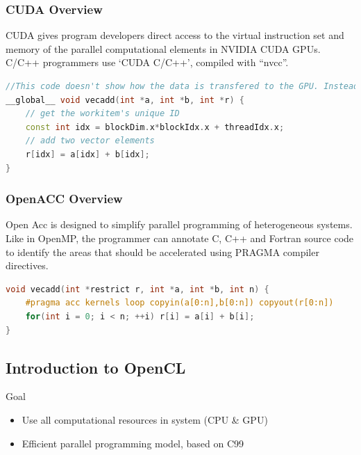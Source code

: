 \hypertarget{cuda-overview}{%
\subsubsection{CUDA Overview}\label{cuda-overview}}

CUDA gives program developers direct access to the virtual instruction
set and memory of the parallel computational elements in NVIDIA CUDA
GPUs. C/C++ programmers use `CUDA C/C++', compiled with ``nvcc''.

\begin{lstlisting}[language=C++]
//This code doesn't show how the data is transfered to the GPU. Instead, this code will be run directly on the GPU. The code identiefies on which thread it is running and gets the proper data (regarding the thread ID) out of the local computing memory.
__global__ void vecadd(int *a, int *b, int *r) {
    // get the workitem's unique ID
    const int idx = blockDim.x*blockIdx.x + threadIdx.x;
    // add two vector elements
    r[idx] = a[idx] + b[idx];
}
\end{lstlisting}

\clearpage
\hypertarget{openacc-overview}{%
\subsubsection{OpenACC Overview}\label{openacc-overview}}

Open Acc is designed to simplify parallel programming of heterogeneous
systems. Like in OpenMP, the programmer can annotate C, C++ and Fortran
source code to identify the areas that should be accelerated using
PRAGMA compiler directives.

\begin{lstlisting}[language=C++]
void vecadd(int *restrict r, int *a, int *b, int n) {
    #pragma acc kernels loop copyin(a[0:n],b[0:n]) copyout(r[0:n])
    for(int i = 0; i < n; ++i) r[i] = a[i] + b[i];
}
\end{lstlisting}

\hypertarget{introduction-to-opencl}{%
\subsection{Introduction to OpenCL}\label{introduction-to-opencl}}

Goal

\begin{itemize}
\tightlist
\item
  Use all computational resources in system (CPU \& GPU)
\item
  Efficient parallel programming model, based on C99
\end{itemize}

